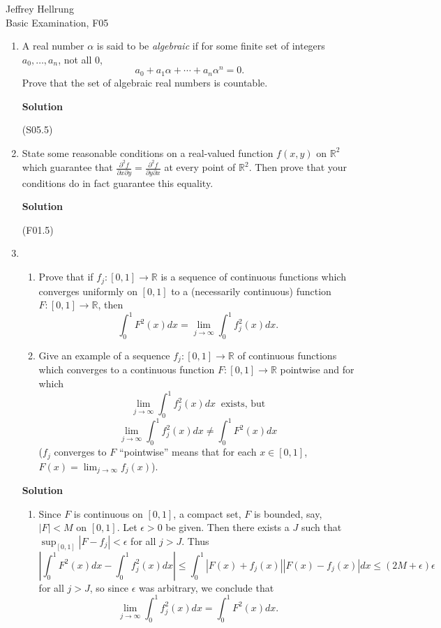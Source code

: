 \documentclass{article}
\begin{document}
\begin{flushright}
Jeffrey Hellrung \\
Basic Examination, F05 \\
\end{flushright}


\begin{enumerate}

\item A real number \(\alpha\) is said to be {\em algebraic} if for some finite set of integers \(a_0, \ldots, a_n\), not all \(0\),
\[a_0 + a_1 \alpha + \cdots + a_n \alpha^n = 0.\]
Prove that the set of algebraic real numbers is countable.

{\bf Solution}

(S05.5)



\item State some reasonable conditions on a real-valued function \(f(x,y)\) on \(\mathbb{R}^2\) which guarantee that \(\frac{\partial^2 f}{\partial x \partial y} = \frac{\partial^2 f}{\partial y \partial x}\) at every point of \(\mathbb{R}^2\).  Then prove that your conditions do in fact guarantee this equality.

{\bf Solution}

(F01.5)



\item

\begin{enumerate}
\item Prove that if \(f_j : [0,1] \to \mathbb{R}\) is a sequence of continuous functions which converges uniformly on \([0,1]\) to a (necessarily continuous) function \(F : [0,1] \to \mathbb{R}\), then
\[\int_0^1 F^2(x) dx = \lim_{j \to \infty} \int_0^1 f_j^2(x) dx.\]

\item Give an example of a sequence \(f_j : [0,1] \to \mathbb{R}\) of continuous functions which converges to a continuous function \(F : [0,1] \to \mathbb{R}\) pointwise and for which
\[\lim_{j \to \infty} \int_0^1 f_j^2(x) dx \ \text{ exists, but}\]
\[\lim_{j \to \infty} \int_0^1 f_j^2(x) dx \neq \int_0^1 F^2(x) dx\]
(\(f_j\) converges to \(F\) ``pointwise'' means that for each \(x \in [0,1]\), \(F(x) = \lim_{j \to \infty} f_j(x)\)).

\end{enumerate}

{\bf Solution}

\begin{enumerate}
\item Since \(F\) is continuous on \([0,1]\), a compact set, \(F\) is bounded, say, \(|F| < M\) on \([0,1]\).  Let \(\epsilon > 0\) be given.  Then there exists a \(J\) such that \(\sup_{[0,1]} |F - f_j| < \epsilon\) for all \(j > J\).  Thus
\[\left| \int_0^1 F^2(x) dx - \int_0^1 f_j^2(x) dx \right|
  \leq \int_0^1 |F(x) + f_j(x)| |F(x) - f_j(x)| dx
  \leq (2M + \epsilon) \epsilon\]
for all \(j > J\), so since \(\epsilon\) was arbitrary, we conclude that
\[\lim_{j \to \infty} \int_0^1 f_j^2(x) dx = \int_0^1 F^2(x) dx.\]


\end{enumerate}
\end{enumerate}
\end{document}

